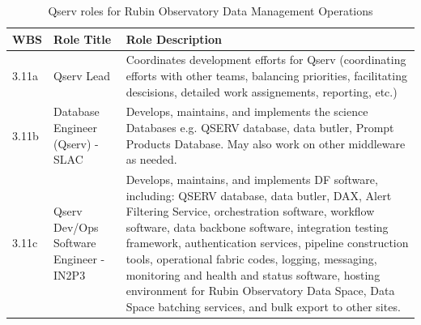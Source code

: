 \normalsize \begin{longtable} {|p{}|p{}|p{}|} \caption{Qserv roles for Rubin Observatory Data Management Operations \label{tab:qsroles}}\\ 
\hline 
\textbf{WBS}&\textbf{Role Title}&\textbf{Role Description} \\ \hline
{3.11a}&{Qserv Lead}&{Coordinates development efforts for Qserv (coordinating efforts with other teams, balancing priorities, facilitating descisions, detailed work assignements, reporting, etc.)} \\ \hline
{3.11b}&{Database Engineer (Qserv) - SLAC}&{Develops, maintains, and implements the science Databases e.g. QSERV database, data butler, Prompt Products Database. May also work on other middleware as needed.} \\ \hline
{3.11c}&{Qserv Dev/Ops Software Engineer - IN2P3}&{Develops, maintains, and implements DF software, including: QSERV database, data butler, DAX, Alert Filtering Service, orchestration software, workflow software, data backbone software, integration testing framework, authentication services, pipeline construction tools, operational fabric codes, logging, messaging, monitoring and health and status software, hosting environment for Rubin Observatory Data Space, Data Space batching services, and bulk export to other sites.} \\ \hline
\end{longtable} \normalsize
